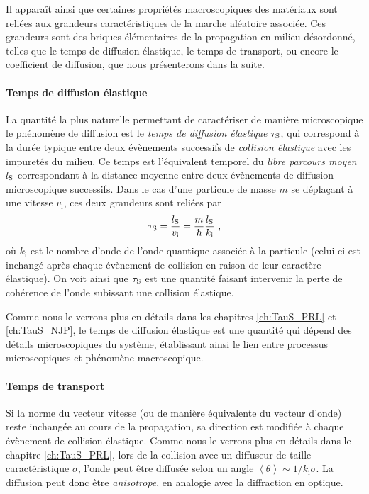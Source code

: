 Il apparaît ainsi que certaines propriétés macroscopiques des matériaux sont reliées aux grandeurs caractéristiques de la marche aléatoire associée. Ces grandeurs sont des briques élémentaires de la propagation en milieu désordonné, telles que le temps de diffusion élastique, le temps de transport, ou encore le coefficient de diffusion, que nous présenterons dans la suite.

\paragraph*{Temps de diffusion élastique}
La quantité la plus naturelle permettant de caractériser de manière microscopique le phénomène de diffusion est le \emph{temps de diffusion élastique} $\tau_{\mathrm{S}}$, qui correspond à la durée typique entre deux évènements successifs de \emph{collision élastique} avec les impuretés du milieu. Ce temps est l'équivalent temporel du \emph{libre parcours moyen}  $l_{\mathrm{S}}$ correspondant à la distance moyenne entre deux évènements de diffusion microscopique successifs. Dans le cas d'une particule de masse $m$ se déplaçant à une vitesse $v_{\mathrm{i}}$, ces deux grandeurs sont reliées par
\begin{equation}
\tau_{\mathrm{S}}=\frac{l_{\mathrm{S}}}{v_{\mathrm{i}}}=\frac{m}{\hslash} \frac{l_{\mathrm{S}}}{k_{\mathrm{i}}} \text{ ,}
\label{eq:definition_taus}
\end{equation}
où $k_{\mathrm{i}}$ est le nombre d'onde de l'onde quantique associée à la particule (celui-ci est inchangé après chaque évènement de collision en raison de leur caractère élastique). On voit ainsi que $\tau_{\mathrm{S}}$ est une quantité faisant intervenir la perte de cohérence de l'onde subissant une collision élastique.

Comme nous le verrons plus en détails dans les chapitres \ref{ch:TauS_PRL} et \ref{ch:TauS_NJP}, le temps de diffusion élastique est une quantité qui dépend des détails microscopiques du système, établissant ainsi le lien entre processus microscopiques et phénomène macroscopique.


\paragraph*{Temps de transport}
Si la norme du vecteur vitesse (ou de manière équivalente du vecteur d'onde) reste inchangée au cours de la propagation, sa direction est modifiée à chaque évènement de collision élastique. Comme nous le verrons plus en détails dans le chapitre \ref{ch:TauS_PRL}, lors de la collision avec un diffuseur de taille caractéristique $\sigma$, l'onde peut être diffusée selon un angle $\left\langle\theta\right\rangle\sim 1/k_{\mathrm{i}} \sigma$. La diffusion peut donc être \emph{anisotrope}, en analogie avec la diffraction en optique.

